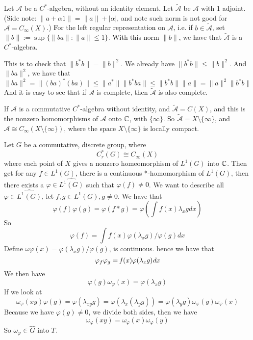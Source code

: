 \begin{proposition}
    Let $\mathcal{A}$ be a $C^*$-algebra, without an identity element. Let $\tilde{\mathcal{A}}$ be $\mathcal{A}$ with 1 adjoint. (Side note: $\|a+\alpha 1\|=\|a\|+|\alpha|$, and note such norm is not good for $\mathcal{A}=C_\infty(X)$.) For the left regular representation on $\mathcal{A}$, i.e. if $b\in\tilde{\mathcal{A}}$, set $\|b\|:=\sup\{\|ba\|: \|a\|\leq 1\}$. With this norm $\|b\|$, we have that $\tilde{\mathcal{A}}$ is a $C^*$-algebra. 
\end{proposition}
This is to check that $\|b^*b\|=\|b\|^2$. We already have $\|b^*b\|\leq\|b\|^2$. And $\|ba\|^2$, we have that
\begin{equation*}
    \|ba\|^2=\|(ba)^*(ba)\|\leq\|a^*\|\|b^*ba\|\leq\|b^*b\|\|a\|=\|a\|^2\|b^*b\|
\end{equation*}
And it is easy to see that if $\mathcal{A}$ is complete, then $\tilde{\mathcal{A}}$ is also complete.

If $\mathcal{A}$ is a commutative $C^*$-algebra without identity, and $\tilde{\mathcal{A}}=C(X)$, and this is the nonzero homomorphisms of $\mathcal{A}$ onto $\mathbb{C}$, with $\{\infty\}$. So $\tilde{\mathcal{A}}=X\setminus\{\infty\}$, and $\mathcal{A}\cong C_\infty(X\setminus \{\infty\})$, where the space $X\setminus\{\infty\}$ is locally compact. 

Let $G$ be a commutative, discrete group, where
\begin{equation*}
    C_r^*(G)\cong C_\infty(X)
\end{equation*}
where each point of $X$ gives a nonzero homeomorphism of $L^1(G)$ into $\mathbb{C}$. Then get for any $f\in L^1(G)$, there is a continuous *-homomorphism of $L^1(G)$, then there exists a $\varphi\in\widehat{L^1(G)}$ such that $\varphi(f)\neq 0$. We want to describe all $\varphi\in\widehat{L^1(G)}$, let $f,g\in L^1(G), g\neq 0$. We have that
\begin{equation*}
    \varphi(f)\varphi(g)=\varphi(f\ast g)=\varphi(\int f(x)\lambda_xgdx)
\end{equation*}
So
\begin{equation*}
    \varphi(f)=\int f(x)\varphi(\lambda_x g)/\varphi(g)dx
\end{equation*}
Define $\omega\varphi(x)=\varphi(\lambda_xg)/\varphi(g)$, is continuous. hence we have that
\begin{equation*}
    \varphi_f\varphi_g=\it f(x)\varphi(\lambda_xg)dx
\end{equation*}
We then have
\begin{equation*}
    \varphi(g)\omega_\varphi(x)=\varphi(\lambda_xg)
\end{equation*}
If we look at 
\begin{equation*}
    \omega_\varphi(xy)\varphi(g)=\varphi(\lambda_{xy}g)=\varphi(\lambda_x(\lambda_yg))=\varphi(\lambda_yg)\omega_\varphi(y)\omega_\varphi(x)
\end{equation*}
Because we have $\varphi(g)\neq 0$, we divide both sides, then we have
\begin{equation*}
    \omega_\varphi(xy)=\omega_\varphi(x)\omega_\varphi(y)
\end{equation*}
So $\omega_\varphi\in\widehat{G}$ into $T$.

